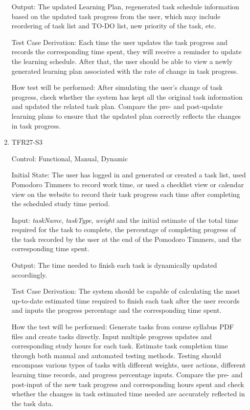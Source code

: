 \documentclass[12pt, titlepage]{article}
\begin{document}
\begin{enumerate}
Output: The updated Learning Plan, regenerated task schedule information based on the updated task progress from the user, which may include reordering of task list and TO-DO list, new priority of the task, etc.

Test Case Derivation: Each time the user updates the task progress and records the corresponding time spent, they will receive a reminder to update the learning schedule. After that, the user should be able to view a newly generated learning plan associated with the rate of change in task progress.
					
How test will be performed: After simulating the user's change of task progress, check whether the system has kept all the original task information and updated the related task plan. Compare the pre- and post-update learning plans to ensure that the updated plan correctly reflects the changes in task progress.

\item{TFR27-S3\\}

Control: Functional, Manual, Dynamic
					
Initial State: The user has logged in and generated or created a task list, used Pomodoro Timmers to record work time, or used a checklist view or calendar view on the website to record their task progress each time after completing the scheduled study time period.
					
Input: \textit{taskName}, \textit{taskType}, \textit{weight} and the initial estimate of the total time required for the task to complete, the percentage of completing progress of the task recorded by the user at the end of the Pomodoro Timmers, and the corresponding time spent.
					
Output: The time needed to finish each task is dynamically updated accordingly.

Test Case Derivation: The system should be capable of calculating the most up-to-date estimated time required to finish each task after the user records and inputs the progress percentage and the corresponding time spent.
					
How the test will be performed: Generate tasks from course syllabus PDF files and create tasks directly. Input multiple progress updates and corresponding study hours for each task. Estimate task completion time through both manual and automated testing methods. Testing should encompass various types of tasks with different weights, user actions, different learning time records, and progress percentage inputs. Compare the pre- and post-input of the new task progress and corresponding hours spent and check whether the changes in task estimated time needed are accurately reflected in the task data.


\end{enumerate}
\end{document}
